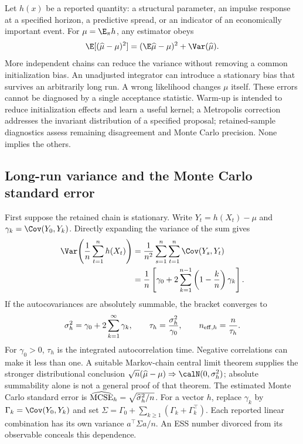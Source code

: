 Let $h(x)$ be a reported quantity: a structural parameter, an impulse
response at a specified horizon, a predictive spread, or an indicator of an
economically important event. For $\mu=\E_\pi h$, any estimator obeys
\begin{equation}
 \E[(\widehat\mu-\mu)^2]
   =(\E\widehat\mu-\mu)^2+\Var(\widehat\mu).
 \label{eq:bf-modern-mse}
\end{equation}
More independent chains can reduce the variance without removing a common
initialization bias. An unadjusted integrator can introduce a stationary bias
that survives an arbitrarily long run. A wrong likelihood changes $\mu$
itself. These errors cannot be diagnosed by a single acceptance statistic.
Warm-up is intended to reduce initialization effects and learn a useful
kernel; a Metropolis correction addresses the invariant distribution of a
specified proposal; retained-sample diagnostics assess remaining disagreement
and Monte Carlo precision. None implies the others.

\subsection{Long-run variance and the Monte Carlo standard error}

First suppose the retained chain is stationary. Write
$Y_t=h(X_t)-\mu$ and $\gamma_k=\Cov(Y_0,Y_k)$. Directly expanding the
variance of the sum gives
\begin{align}
 \Var\!\left(\frac1n\sum_{t=1}^n h(X_t)\right)
 &=\frac1{n^2}\sum_{s=1}^n\sum_{t=1}^n\Cov(Y_s,Y_t)\\
 &=\frac1n\left[\gamma_0+
        2\sum_{k=1}^{n-1}\left(1-\frac{k}{n}\right)\gamma_k\right].
 \label{eq:bf-modern-finite-mc-variance}
\end{align}
If the autocovariances are absolutely summable, the bracket converges to
\begin{equation}
 \sigma_h^2=\gamma_0+2\sum_{k=1}^\infty\gamma_k,\qquad
 \tau_h=\frac{\sigma_h^2}{\gamma_0},\qquad
 n_{{\rm eff},h}=\frac{n}{\tau_h}.
 \label{eq:bf-modern-longrun-variance}
\end{equation}
For $\gamma_0>0$, $\tau_h$ is the integrated autocorrelation time.
Negative correlations can make it less than one. A suitable Markov-chain
central limit theorem supplies the stronger distributional conclusion
$\sqrt n(\widehat\mu-\mu)\Rightarrow\calN(0,\sigma_h^2)$;
absolute summability alone is not a general proof of that theorem.
The estimated Monte Carlo standard error is
$\widehat{\rm MCSE}_h=\sqrt{\widehat\sigma_h^2/n}$.
For a vector $h$, replace $\gamma_k$ by $\Gamma_k=\Cov(Y_0,Y_k)$ and set
$\Sigma=\Gamma_0+\sum_{k\geq1}(\Gamma_k+\Gamma_k^\top)$.
Each reported linear combination has its own variance $a^\top\Sigma a/n$.
An ESS number divorced from its observable conceals this dependence.

